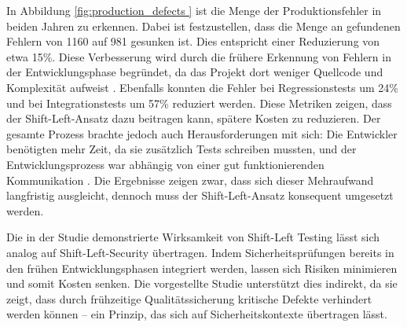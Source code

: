 In Abbildung \ref{fig:production_defects } ist die Menge der Produktionsfehler in beiden Jahren zu erkennen. Dabei ist festzustellen, dass die Menge an gefundenen Fehlern von 1160 auf 981 gesunken ist. Dies entspricht einer Reduzierung von etwa 15\%. Diese Verbesserung wird durch die frühere Erkennung von Fehlern in der Entwicklungsphase begründet, da das Projekt dort weniger Quellcode und Komplexität aufweist \cite{andriadi_impact_2023}. Ebenfalls konnten die Fehler bei Regressionstests um 24\% und bei Integrationstests um 57\% reduziert werden. Diese Metriken zeigen, dass der Shift-Left-Ansatz dazu beitragen kann, spätere Kosten zu reduzieren. Der gesamte Prozess brachte jedoch auch Herausforderungen mit sich: Die Entwickler benötigten mehr Zeit, da sie zusätzlich Tests schreiben mussten, und der Entwicklungsprozess war abhängig von einer gut funktionierenden Kommunikation \cite{andriadi_impact_2023}. Die Ergebnisse zeigen zwar, dass sich dieser Mehraufwand langfristig ausgleicht, dennoch muss der Shift-Left-Ansatz konsequent umgesetzt werden.

Die in der Studie demonstrierte Wirksamkeit von Shift-Left Testing lässt sich analog auf Shift-Left-Security übertragen. Indem Sicherheitsprüfungen bereits in den frühen Entwicklungsphasen integriert werden, lassen sich Risiken minimieren und somit Kosten senken. Die vorgestellte Studie unterstützt dies indirekt, da sie zeigt, dass durch frühzeitige Qualitätssicherung kritische Defekte verhindert werden können – ein Prinzip, das sich auf Sicherheitskontexte übertragen lässt.